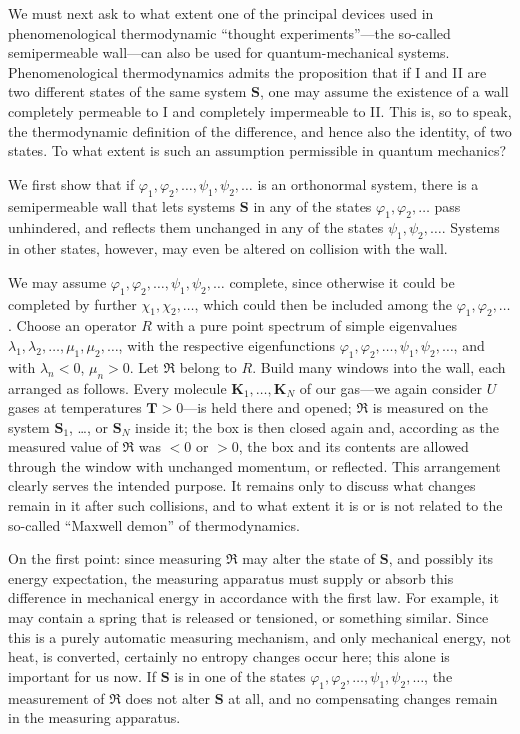 \documentclass[fontsize=13pt,twoside,openany,headings=normal,parskip=false,bookmarkpackage=false,DIV=calc]{scrbook}
\begin{document}
We must next ask to what extent one of the principal devices used in phenomenological thermodynamic ``thought experiments''---the so-called semipermeable wall---can also be used for quantum-mechanical systems. Phenomenological thermodynamics admits the proposition that if I and II are two different states of the same system $\boldsymbol{S}$, one may assume the existence of a wall completely permeable to I and completely impermeable to II. This is, so to speak, the thermodynamic definition of the difference, and hence also the identity, of two states. To what extent is such an assumption permissible in quantum mechanics?

We first show that if $\varphi_1,\varphi_2,\ldots,\psi_1,\psi_2,\ldots$ is an orthonormal system, there is a semipermeable wall that lets systems $\boldsymbol{S}$ in any of the states $\varphi_1,\varphi_2,\ldots$ pass unhindered, and reflects them unchanged in any of the states $\psi_1,\psi_2,\ldots$. Systems in other states, however, may even be altered on collision with the wall.

We may assume $\varphi_1,\varphi_2,\ldots,\psi_1,\psi_2,\ldots$ complete, since otherwise it could be completed by further $\chi_1,\chi_2,\ldots$, which could then be included among the $\varphi_1,\varphi_2,\ldots$. Choose an operator $R$ with a pure point spectrum of simple eigenvalues $\lambda_1,\lambda_2,\ldots,\mu_1,\mu_2,\ldots$, with the respective eigenfunctions $\varphi_1,\varphi_2,\ldots,\psi_1,\psi_2,\ldots$, and with $\lambda_n<0$, $\mu_n>0$. Let $\mathfrak R$ belong to $R$. Build many windows into the wall, each arranged as follows. Every molecule $\boldsymbol{K}_1,\ldots,\boldsymbol{K}_N$ of our gas---we again consider $U$ gases at temperatures $\mathbf T>0$---is held there and opened; $\mathfrak R$ is measured on the system $\boldsymbol{S}_1$, \ldots, or $\boldsymbol{S}_N$ inside it; the box is then closed again and, according as the measured value of $\mathfrak R$ was $<0$ or $>0$, the box and its contents are allowed through the window with unchanged momentum, or reflected. This arrangement clearly serves the intended purpose. It remains only to discuss what changes remain in it after such collisions, and
\hypertarget{origpage-197}{}%
to what extent it is or is not related to the so-called ``Maxwell demon'' of thermodynamics.

On the first point: since measuring $\mathfrak R$ may alter the state of $\boldsymbol{S}$, and possibly its energy expectation, the measuring apparatus must supply or absorb this difference in mechanical energy in accordance with the first law. For example, it may contain a spring that is released or tensioned, or something similar. Since this is a purely automatic measuring mechanism, and only mechanical energy, not heat, is converted, certainly no entropy changes occur here; this alone is important for us now. If $\boldsymbol{S}$ is in one of the states $\varphi_1,\varphi_2,\ldots,\psi_1,\psi_2,\ldots$, the measurement of $\mathfrak R$ does not alter $\boldsymbol{S}$ at all, and no compensating changes remain in the measuring apparatus.
\end{document}
